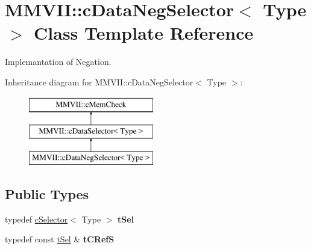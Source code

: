 \hypertarget{classMMVII_1_1cDataNegSelector}{}\section{M\+M\+V\+II\+:\+:c\+Data\+Neg\+Selector$<$ Type $>$ Class Template Reference}
\label{classMMVII_1_1cDataNegSelector}


Implemantation of Negation.  


Inheritance diagram for M\+M\+V\+II\+:\+:c\+Data\+Neg\+Selector$<$ Type $>$\+:\begin{figure}[H]
\begin{center}
\leavevmode
\includegraphics[height=3.000000cm]{classMMVII_1_1cDataNegSelector}
\end{center}
\end{figure}
\subsection*{Public Types}
\begin{DoxyCompactItemize}
\item 
typedef \hyperlink{classMMVII_1_1cSelector}{c\+Selector}$<$ Type $>$ {\bfseries t\+Sel}\hypertarget{classMMVII_1_1cDataNegSelector_a5593dec2bfba55e7cf093bd1b8b8f72f}{}\label{classMMVII_1_1cDataNegSelector_a5593dec2bfba55e7cf093bd1b8b8f72f}

\item 
typedef const \hyperlink{classMMVII_1_1cSelector}{t\+Sel} \& {\bfseries t\+C\+RefS}\hypertarget{classMMVII_1_1cDataNegSelector_a2997b7fadb1be591d564985a61d94f9d}{}\label{classMMVII_1_1cDataNegSelector_a2997b7fadb1be591d564985a61d94f9d}

\end{DoxyCompactItemize}
